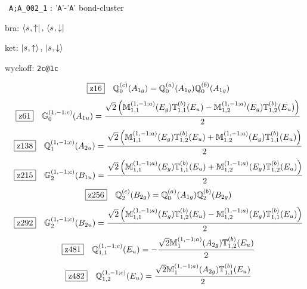 \documentclass[fleqn,10pt,landscape]{jsarticle}
\begin{document}
\noindent\textbullet\, \texttt{A;A_002_1} : '\texttt{A}'-'\texttt{A}' bond-cluster

\noindent\quad * bra: $\bra{s_{},\uparrow},\, \bra{s_{},\downarrow}$

\noindent\quad * ket: $\ket{s_{},\uparrow},\, \ket{s_{},\downarrow}$

\noindent\quad * wyckoff: \texttt{2c@1c}

\begin{dmath*}
\hspace*{3mm}\fbox{z16}\quad \mathbb{Q}_{0}^{(c)}(A_{1g})=\mathbb{Q}_{0}^{(a)}(A_{1g}) \mathbb{Q}_{0}^{(b)}(A_{1g})
\end{dmath*}
\begin{dmath*}
\hspace*{3mm}\fbox{z61}\quad \mathbb{G}_{0}^{(1,-1;c)}(A_{1u})=\frac{\sqrt{2} \left(\mathbb{M}_{1,1}^{(1,-1;a)}(E_{g}) \mathbb{T}_{1,1}^{(b)}(E_{u}) - \mathbb{M}_{1,2}^{(1,-1;a)}(E_{g}) \mathbb{T}_{1,2}^{(b)}(E_{u})\right)}{2}
\end{dmath*}
\begin{dmath*}
\hspace*{3mm}\fbox{z138}\quad \mathbb{Q}_{1}^{(1,-1;c)}(A_{2u})=\frac{\sqrt{2} \left(\mathbb{M}_{1,1}^{(1,-1;a)}(E_{g}) \mathbb{T}_{1,2}^{(b)}(E_{u}) + \mathbb{M}_{1,2}^{(1,-1;a)}(E_{g}) \mathbb{T}_{1,1}^{(b)}(E_{u})\right)}{2}
\end{dmath*}
\begin{dmath*}
\hspace*{3mm}\fbox{z215}\quad \mathbb{G}_{2}^{(1,-1;c)}(B_{1u})=\frac{\sqrt{2} \left(\mathbb{M}_{1,1}^{(1,-1;a)}(E_{g}) \mathbb{T}_{1,1}^{(b)}(E_{u}) + \mathbb{M}_{1,2}^{(1,-1;a)}(E_{g}) \mathbb{T}_{1,2}^{(b)}(E_{u})\right)}{2}
\end{dmath*}
\begin{dmath*}
\hspace*{3mm}\fbox{z256}\quad \mathbb{Q}_{2}^{(c)}(B_{2g})=\mathbb{Q}_{0}^{(a)}(A_{1g}) \mathbb{Q}_{2}^{(b)}(B_{2g})
\end{dmath*}
\begin{dmath*}
\hspace*{3mm}\fbox{z292}\quad \mathbb{G}_{2}^{(1,-1;c)}(B_{2u})=\frac{\sqrt{2} \left(\mathbb{M}_{1,1}^{(1,-1;a)}(E_{g}) \mathbb{T}_{1,2}^{(b)}(E_{u}) - \mathbb{M}_{1,2}^{(1,-1;a)}(E_{g}) \mathbb{T}_{1,1}^{(b)}(E_{u})\right)}{2}
\end{dmath*}
\begin{dmath*}
\hspace*{3mm}\fbox{z481}\quad \mathbb{Q}_{1,1}^{(1,-1;c)}(E_{u})=- \frac{\sqrt{2} \mathbb{M}_{1}^{(1,-1;a)}(A_{2g}) \mathbb{T}_{1,2}^{(b)}(E_{u})}{2}
\end{dmath*}
\begin{dmath*}
\hspace*{3mm}\fbox{z482}\quad \mathbb{Q}_{1,2}^{(1,-1;c)}(E_{u})=\frac{\sqrt{2} \mathbb{M}_{1}^{(1,-1;a)}(A_{2g}) \mathbb{T}_{1,1}^{(b)}(E_{u})}{2}
\end{dmath*}
\vspace{5mm}
\end{document}
